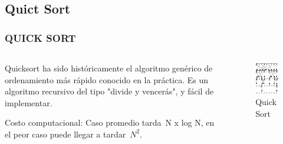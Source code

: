 \documentclass[
	11pt, %
]{beamer}
\begin{document}
\subsection{Quict Sort}
\begin{frame}
	\frametitle{QUICK SORT}
    \begin{columns}[t] %
		\begin{column}{0.45\textwidth} %
			
        Quicksort ha sido históricamente el algoritmo genérico de ordenamiento más rápido conocido en la práctica. Es un algoritmo recursivo del tipo "divide y vencerás", y fácil de implementar.

        Costo computacional: Caso promedio tarda N x log N, en el peor caso puede llegar a tardar $N^2$.

		\end{column}		
		\begin{column}{0.5\textwidth} %
			\begin{figure}
		      \includegraphics[width=0.8\linewidth]{quickSort.png}
		      \caption{Quick Sort}
	   \end{figure}
		
		\end{column}
	\end{columns}
\end{frame}
\end{document}
